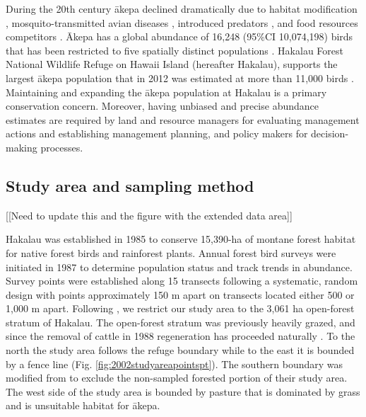 \documentclass[preprint,12pt]{elsarticle}
\newcommand{\akepa}{\textquotesingle\={a}kepa}  %
\newcommand{\Akepa}{\textquotesingle\={A}kepa}  %
\newcommand{\hawaii}{Hawai\textquotesingle i}   %
\begin{document}
During the 20th century \akepa{} declined dramatically due to habitat modification \citep{scott_HFBS_1986, pratt_avifaunal_1994},  mosquito-transmitted avian diseases \citep{pratt_avifaunal_1994, atkinson_wildlife_1995}, introduced predators \citep{lepson_akepa_1997}, and food resources competitors \citep{lepson_akepa_1997}. \Akepa{} has a global abundance of 16,248 (95\%CI 10,074,198) birds that has been restricted to five spatially distinct populations \citep{judge_akepa_2018}. Hakalau Forest National Wildlife Refuge on \hawaii{} Island (hereafter Hakalau), supports the largest \akepa{} population that in 2012 was estimated at more than 11,000 birds \citep{camp_statespace_2016}. Maintaining and expanding the \akepa{} population at Hakalau is a primary conservation concern. Moreover, having unbiased and precise abundance estimates are required by land and resource managers for evaluating management actions and establishing management planning, and policy makers for decision-making processes.

\subsection*{Study area and sampling method}

[[Need to update this and the figure with the extended data area]]

Hakalau was established in 1985 to conserve 15,390-ha of montane forest habitat for native forest birds and rainforest plants. Annual forest bird surveys were initiated in 1987 to determine population status and track trends in abundance. Survey points were established along 15 transects following a systematic, random design with points approximately 150 m apart on transects located either 500 or 1,000 m apart. Following \cite{camp_population_2010, camp_statespace_2016}, we restrict our study area to the 3,061 ha open-forest stratum of Hakalau.  The open-forest stratum was previously heavily grazed, and since the removal of cattle in 1988 regeneration has proceeded naturally \citep{maxfield_hakalau_1998}. To the north the study area follows the refuge boundary while to the east it is bounded by a fence line (Fig. \ref{fig:2002studyareapointspt}). The southern boundary was modified from \cite{camp_population_2010} to exclude the non-sampled forested portion of their study area. The west side of the study area is bounded by pasture that is dominated by grass and is unsuitable habitat for \akepa.
\end{document}
